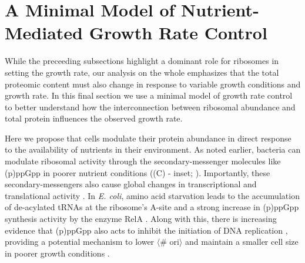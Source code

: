 \section{A Minimal Model of Nutrient-Mediated Growth Rate Control}
While the preceeding subsections highlight a dominant role for ribosomes in
setting the growth rate, our analysis on the whole emphasizes that the total
proteomic content must also change in response to variable growth conditions and
growth rate. In this final section we use a minimal model of growth rate control
to better understand how the interconnection between ribosomal abundance and
total protein influences the observed growth rate.

Here we propose that cells modulate their protein abundance in direct response
to the availability of nutrients in their environment. As noted earlier,
bacteria can modulate ribosomal activity through the secondary-messenger
molecules like (p)ppGpp in poorer nutrient conditions ((C) -
inset; \cite{dai2016}). Importantly, these secondary-messengers also cause
global changes in transcriptional and translational activity
\citep{hauryliuk2015, zhu2019, Buke2020}. In \textit{E. coli}, amino acid
starvation leads to the accumulation of de-acylated tRNAs at the ribosome's
A-site and a strong increase in (p)ppGpp synthesis activity by the enzyme RelA
\citep{hauryliuk2015}. Along with this,  there is increasing evidence that
(p)ppGpp also acts to inhibit the initiation of DNA replication
\citep{kraemer2019}, providing a potential mechanism to lower $\langle$\#
ori$\rangle$ and maintain a smaller cell size in poorer growth conditions
\citep{fernandezcoll2020}.


%



